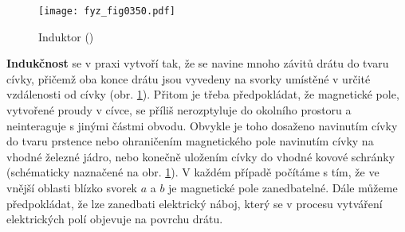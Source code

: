   \begin{figure}[ht!] %
    \centering
    \texttt{[image: fyz\_fig0350.pdf]}
    \caption{Induktor
             (\cite[s.~391]{Feynman02})}
    \label{fyz:fig0350}
  \end{figure}
   
  \textbf{Indukčnost} se v praxi vytvoří tak, že se navine mnoho závitů drátu do tvaru cívky, 
  přičemž oba konce drátu jsou vyvedeny na svorky umístěné v určité vzdálenosti od cívky (obr. 
  \ref{fyz:fig0350}). Přitom je třeba předpokládat, že magnetické pole, vytvořené proudy v cívce, se 
  příliš nerozptyluje do okolního prostoru a neinteraguje s jinými částmi obvodu. Obvykle je toho 
  dosaženo navinutím cívky do tvaru prstence nebo ohraničením magnetického pole navinutím cívky na 
  vhodné železné jádro, nebo konečně uložením cívky do vhodné kovové schránky (schématicky 
  naznačené na obr. \ref{fyz:fig0350}). V každém případě počítáme s tím, že ve vnější oblasti blízko 
  svorek \(a\) a \(b\) je magnetické pole zanedbatelné. Dále můžeme předpokládat, že lze zanedbati 
  elektrický náboj, který se v procesu vytváření elektrických polí objevuje na povrchu drátu.
  
